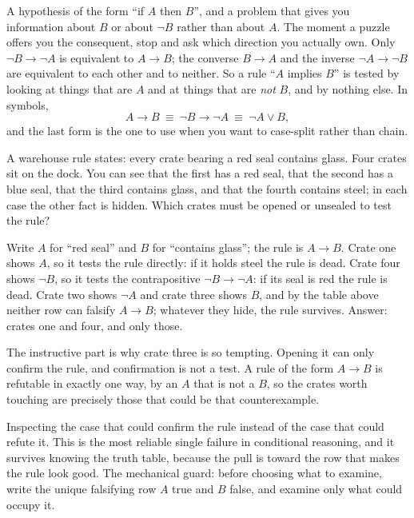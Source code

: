 \cue A hypothesis of the form ``if $A$ then $B$'', and a problem that gives you information about $B$ or about $\lnot B$ rather than about $A$. The moment a puzzle offers you the consequent, stop and ask which direction you actually own.
\method Only $\lnot B\to\lnot A$ is equivalent to $A\to B$; the converse $B\to A$ and the inverse $\lnot A\to\lnot B$ are equivalent to each other and to neither. So a rule ``$A$ implies $B$'' is tested by looking at things that are $A$ and at things that are \emph{not} $B$, and by nothing else. In symbols,
\[A\to B\ \equiv\ \lnot B\to\lnot A\ \equiv\ \lnot A\vee B,\]
and the last form is the one to use when you want to case-split rather than chain.

\begin{worked}
A warehouse rule states: every crate bearing a red seal contains glass. Four crates sit on the dock. You can see that the first has a red seal, that the second has a blue seal, that the third contains glass, and that the fourth contains steel; in each case the other fact is hidden. Which crates must be opened or unsealed to test the rule?

Write $A$ for ``red seal'' and $B$ for ``contains glass''; the rule is $A\to B$. Crate one shows $A$, so it tests the rule directly: if it holds steel the rule is dead. Crate four shows $\lnot B$, so it tests the contrapositive $\lnot B\to\lnot A$: if its seal is red the rule is dead. Crate two shows $\lnot A$ and crate three shows $B$, and by the table above neither row can falsify $A\to B$; whatever they hide, the rule survives. Answer: crates one and four, and only those.

The instructive part is why crate three is so tempting. Opening it can only confirm the rule, and confirmation is not a test. A rule of the form $A\to B$ is refutable in exactly one way, by an $A$ that is not a $B$, so the crates worth touching are precisely those that could be that counterexample.
\end{worked}

\begin{trap}
Inspecting the case that could confirm the rule instead of the case that could refute it. This is the most reliable single failure in conditional reasoning, and it survives knowing the truth table, because the pull is toward the row that makes the rule look good. The mechanical guard: before choosing what to examine, write the unique falsifying row $A$ true and $B$ false, and examine only what could occupy it.
\end{trap}

